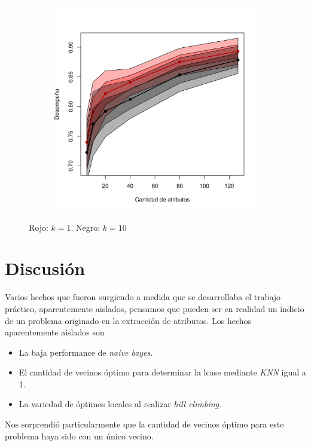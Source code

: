 \documentclass[a4paper,10pt]{article}
\begin{document}
\begin{figure}[H]
  \centering
  \begin{subfigure}[b]{0.4\textwidth}
    \includegraphics[width=\textwidth]{../imagenes/knn}
  \end{subfigure}
  \caption{Rojo: $k=1$. Negro: $k=10$ }
  \label{fig:knn-n_neighbors}
\end{figure}

\section{Discusi\'on}

Varios hechos que fueron surgiendo a medida que se desarrollaba el trabajo pr\'actico, aparentemente aislados, pensamos que pueden ser en realidad un \'indicio de un problema originado en la extracci\'on de atributos. Los hechos aparentemente aislados son

\begin{itemize}
 \item La baja performance de \emph{naive bayes}. 
 \item El cantidad de vecinos \'optimo para determinar la lcase mediante \emph{KNN} igual a 1. 
 \item La variedad de \'optimos locales al realizar \emph{hill climbing}. 
\end{itemize}



Nos sorprendi\'o particularmente que la cantidad de vecinos \'optimo para este problema haya sido con un \'unico vecino. 







\scriptsize


\end{document}
